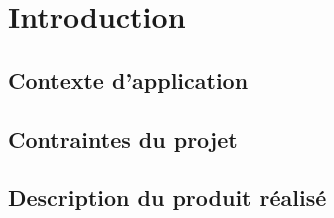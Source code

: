 \documentclass[DIV=15,paper=letter,titlepage=true,fontsize=16pt,headings=normal,captions=nooneline]{scrartcl}
\begin{document}
% 

\setcounter{page}{0}

\section{Introduction} \label{intro}
\subsection{Contexte d'application}

\FloatBarrier
\subsection{ Contraintes du projet }

\FloatBarrier
\subsection{ Description du produit réalisé }

\FloatBarrier
%
%
%
\end{document}
